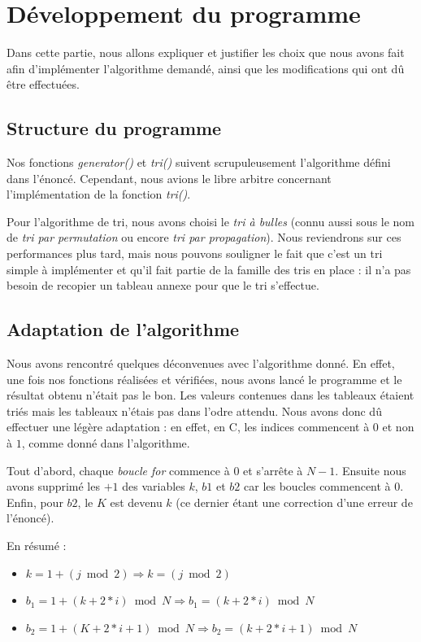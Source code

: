 \documentclass[12pt]{article}
\begin{document}
\section{Développement du programme}

Dans cette partie, nous allons expliquer et justifier les choix que nous avons
fait afin d'implémenter l'algorithme demandé, ainsi que les modifications qui
ont dû être effectuées.

\subsection{Structure du programme}

Nos fonctions \emph{generator()} et \emph{tri()} suivent scrupuleusement
l'algorithme défini dans l'énoncé. Cependant, nous avions le libre arbitre
concernant l'implémentation de la fonction \emph{tri()}.
    
Pour l'algorithme de tri, nous avons choisi le \emph{tri à bulles} (connu aussi
sous le nom de \emph{tri par permutation} ou encore \emph{tri par propagation}).
Nous reviendrons sur ces performances plus tard, mais nous pouvons souligner le
fait que c'est un tri simple à implémenter et qu'il fait partie de la famille
des tris en place : il n'a pas besoin de recopier un tableau annexe pour que le
tri s'effectue. 

\subsection{Adaptation de l'algorithme}

Nous avons rencontré quelques déconvenues avec l'algorithme donné. En effet, une
fois nos fonctions réalisées et vérifiées, nous avons lancé le programme et le
résultat obtenu n'était pas le bon. Les valeurs contenues dans les tableaux
étaient triés mais les tableaux n'étais pas dans l'odre attendu. Nous avons donc
dû effectuer une légère adaptation : en effet, en C, les indices commencent à $0$
et non à $1$, comme donné dans l'algorithme.

Tout d'abord, chaque \emph{boucle for} commence à $0$ et s'arrête à $N-1$.
Ensuite nous avons supprimé les $+1$ des variables $k$, $b1$ et $b2$ car les
boucles commencent à 0. Enfin, pour $b2$, le $K$ est devenu $k$ (ce dernier
étant une correction d'une erreur de l'énoncé). 

En résumé :
\begin{itemize}
    \item $k = 1+(j\bmod 2) \Rightarrow k = (j\bmod 2)$
    \item $b_1 = 1+(k+2*i)\bmod N \Rightarrow b_1 = (k+2*i)\bmod N$
    \item $b_2 = 1+(K+2*i+1)\bmod N \Rightarrow b_2 = (k+2*i+1)\bmod N$
\end{itemize}
\end{document}
